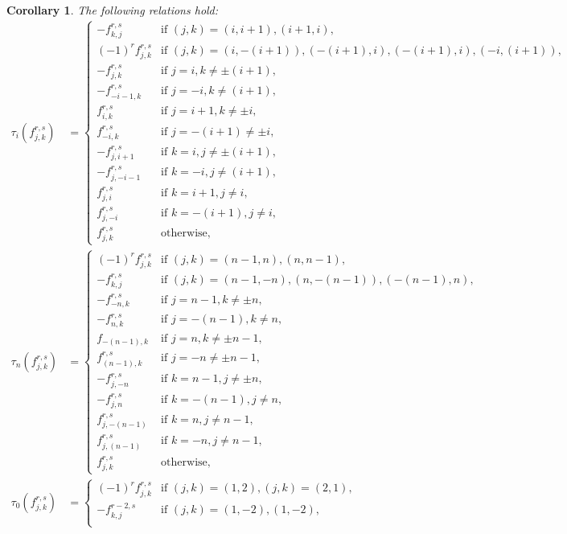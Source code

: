 \documentclass[10pt,a4paper]{amsart}
\numberwithin{equation}{section}
\newtheorem{Corollary}[Theorem]{Corollary}
\theoremstyle{definition}
\begin{document}
\begin{Corollary}\label{Cor25}
The following relations hold:{\samepage
\begin{align*}
\tau_i(f_{j,k}^{r,s})&=\begin{cases}
-f_{k,j}^{r,s}&\text{if }(j,k)=(i,i+1),(i+1,i),\\
(-1)^rf_{j,k}^{r,s}&\text{if }(j,k)=(i,-(i+1)),(-(i+1),i),(-(i+1),i),(-i,(i+1)),\\
-f_{j,k}^{r,s}&\text{if }j=i,k\neq\pm(i+1),\\
-f_{-i-1,k}^{r,s}&\text{if }j=-i,k\neq(i+1),\\
f_{i,k}^{r,s}&\text{if }j=i+1,k\neq \pm i,\\
f_{-i,k}^{r,s}&\text{if }j=-(i+1)\neq \pm i,\\
-f_{j,i+1}^{r,s}&\text{if }k=i,j\neq\pm(i+1),\\
-f_{j,-i-1}^{r,s}&\text{if }k=-i,j\neq(i+1),\\
f_{j,i}^{r,s}&\text{if }k=i+1,j\neq i,\\
f_{j,-i}^{r,s}&\text{if }k=-(i+1),j\neq i,\\
f_{j,k}^{r,s}&\text{otherwise},
\end{cases}\\
\tau_n(f_{j,k}^{r,s})&=\begin{cases}
(-1)^rf_{j,k}^{r,s}&\text{if }(j,k)=(n-1,n),(n,n-1),\\
-f_{k,j}^{r,s}&\text{if }(j,k)=(n-1,-n),(n,-(n-1)),(-(n-1),n),\\
-f_{-n,k}^{r,s}&\text{if }j=n-1,k\neq\pm n,\\
-f_{n,k}^{r,s}&\text{if }j=-(n-1),k\neq n,\\
f_{-(n-1),k}&\text{if }j=n,k\neq \pm n-1,\\
f_{(n-1),k}^{r,s}&\text{if }j=-n\neq \pm n-1,\\
-f_{j,-n}^{r,s}&\text{if }k=n-1,j\neq\pm n,\\
-f_{j,n}^{r,s}&\text{if }k=-(n-1),j\neq n,\\
f_{j,-(n-1)}^{r,s}&\text{if }k=n,j\neq n-1,\\
f_{j,(n-1)}^{r,s}&\text{if }k=-n,j\neq n-1,\\
f_{j,k}^{r,s}&\text{otherwise},
\end{cases}\\
\tau_0(f_{j,k}^{r,s})&=\begin{cases}
(-1)^rf_{j,k}^{r,s}&\text{if }(j,k)=(1,2),(j,k)=(2,1),\\
-f_{k,j}^{r-2,s}&\text{if }(j,k)=(1,-2),(1,-2),\\

\end{cases}
\end{align*}}
\end{Corollary}
\end{document}
